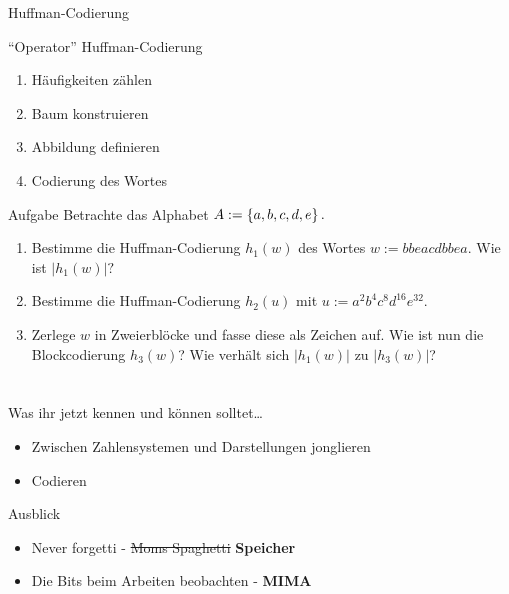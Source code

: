 \begin{frame}{Huffman-Codierung}
	\begin{block}{``Operator'' Huffman-Codierung}
		\begin{enumerate}
			\item Häufigkeiten zählen
			\item Baum konstruieren
			\item Abbildung definieren
			\item Codierung des Wortes
		\end{enumerate}
	\end{block}

	\begin{exampleblock}{Aufgabe}
		Betrachte das Alphabet $A:=\left\{ a,b,c,d,e \right\}.$
		\begin{enumerate}
			\item Bestimme die Huffman-Codierung $h_1(w)$ des Wortes $w:=bbeacdbbea$. Wie ist $|h_1(w)|?$
			\pause \item Bestimme die Huffman-Codierung $h_2(u)$ mit $u:=a^2 b^4 c^8 d^{16} e^{32}$.
			\pause \item Zerlege $w$ in Zweierblöcke und fasse diese als Zeichen auf. Wie ist nun die Blockcodierung $h_3(w)$? Wie verhält sich $|h_1(w)|$ zu $|h_3(w)|$?
		\end{enumerate}
	\end{exampleblock}
\end{frame}

\section{}
	\begin{frame}{Was ihr jetzt kennen und können solltet\dots}
			\begin{itemize}
				\item Zwischen Zahlensystemen und Darstellungen jonglieren
				\item Codieren
			\end{itemize}
	
	\end{frame}
	\begin{frame}{Ausblick}
		\begin{itemize}
			\item Never forgetti - \sout{Moms Spaghetti} \textbf{Speicher}
			\item Die Bits beim Arbeiten beobachten - \textbf{MIMA}
		\end{itemize}
	\end{frame}
\section{}
\questionframe
\lastframe
{}
